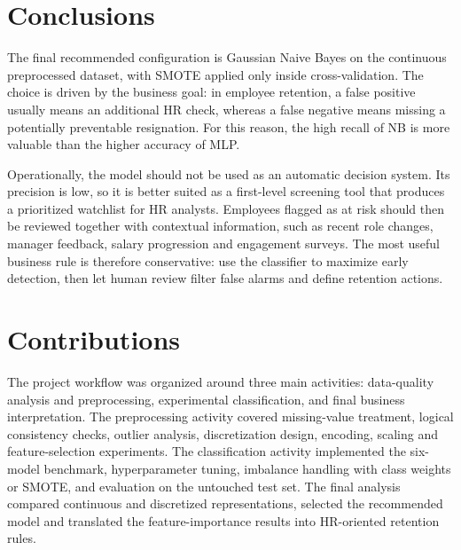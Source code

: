\documentclass[lettersize,journal]{IEEEtran}
\begin{document}
\section{Conclusions}
The final recommended configuration is Gaussian Naive Bayes on the continuous preprocessed dataset, with SMOTE applied only inside cross-validation. The choice is driven by the business goal: in employee retention, a false positive usually means an additional HR check, whereas a false negative means missing a potentially preventable resignation. For this reason, the high recall of NB is more valuable than the higher accuracy of MLP.

Operationally, the model should not be used as an automatic decision system. Its precision is low, so it is better suited as a first-level screening tool that produces a prioritized watchlist for HR analysts. Employees flagged as at risk should then be reviewed together with contextual information, such as recent role changes, manager feedback, salary progression and engagement surveys. The most useful business rule is therefore conservative: use the classifier to maximize early detection, then let human review filter false alarms and define retention actions.

\section{Contributions}
The project workflow was organized around three main activities: data-quality analysis and preprocessing, experimental classification, and final business interpretation. The preprocessing activity covered missing-value treatment, logical consistency checks, outlier analysis, discretization design, encoding, scaling and feature-selection experiments. The classification activity implemented the six-model benchmark, hyperparameter tuning, imbalance handling with class weights or SMOTE, and evaluation on the untouched test set. The final analysis compared continuous and discretized representations, selected the recommended model and translated the feature-importance results into HR-oriented retention rules.
\end{document}
